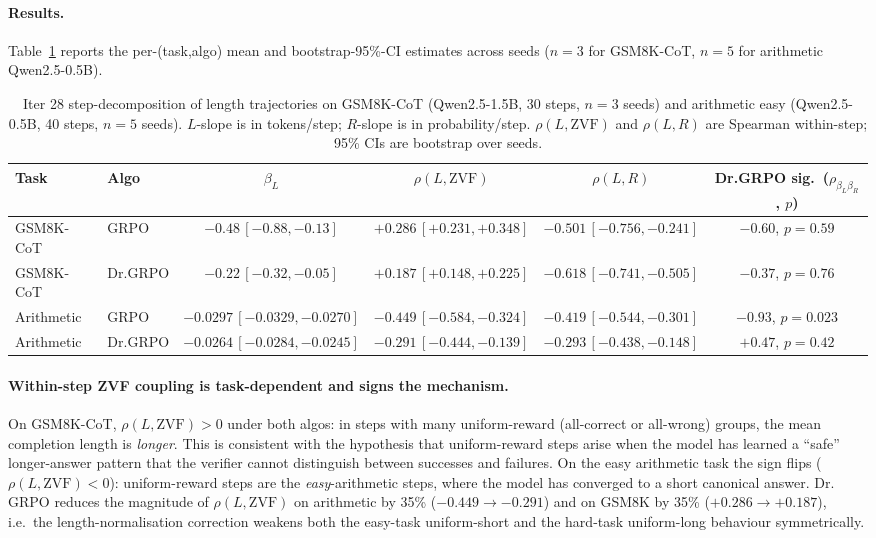 \paragraph{Results.}
Table~\ref{tab:length-bias-iter28} reports the per-(task,algo) mean and
bootstrap-95\%-CI estimates across seeds ($n{=}3$ for GSM8K-CoT,
$n{=}5$ for arithmetic Qwen2.5-0.5B).

\begin{table}[htbp]
\centering
\small
\caption{Iter 28 step-decomposition of length trajectories on GSM8K-CoT
(Qwen2.5-1.5B, 30 steps, $n{=}3$ seeds) and arithmetic easy
(Qwen2.5-0.5B, 40 steps, $n{=}5$ seeds). $L$-slope is in tokens/step;
$R$-slope is in probability/step. $\rho(L,\mathrm{ZVF})$ and $\rho(L,R)$
are Spearman within-step; 95\% CIs are bootstrap over seeds.
\label{tab:length-bias-iter28}}
\begin{tabular}{llcccc}
\hline
Task & Algo & $\beta_L$ & $\rho(L,\mathrm{ZVF})$ & $\rho(L,R)$ & Dr.GRPO sig.\ ($\rho_{\beta_L\beta_R}$, $p$) \\
\hline
GSM8K-CoT & GRPO & $-0.48\,[-0.88,-0.13]$ & $+0.286\,[+0.231,+0.348]$ & $-0.501\,[-0.756,-0.241]$ & $-0.60$, $p{=}0.59$ \\
GSM8K-CoT & Dr.GRPO & $-0.22\,[-0.32,-0.05]$ & $+0.187\,[+0.148,+0.225]$ & $-0.618\,[-0.741,-0.505]$ & $-0.37$, $p{=}0.76$ \\
Arithmetic & GRPO & $-0.0297\,[-0.0329,-0.0270]$ & $-0.449\,[-0.584,-0.324]$ & $-0.419\,[-0.544,-0.301]$ & $\mathbf{-0.93}$, $p{=}0.023$ \\
Arithmetic & Dr.GRPO & $-0.0264\,[-0.0284,-0.0245]$ & $-0.291\,[-0.444,-0.139]$ & $-0.293\,[-0.438,-0.148]$ & $+0.47$, $p{=}0.42$ \\
\hline
\end{tabular}
\end{table}

\paragraph{Within-step ZVF coupling is task-dependent and signs the
mechanism.}
On GSM8K-CoT, $\rho(L, \mathrm{ZVF}) > 0$ under both algos: in steps with
many uniform-reward (all-correct or all-wrong) groups, the mean
completion length is \emph{longer}. This is consistent with the
hypothesis that uniform-reward steps arise when the model has learned a
``safe'' longer-answer pattern that the verifier cannot distinguish
between successes and failures. On the easy arithmetic task the sign
flips ($\rho(L, \mathrm{ZVF}) < 0$): uniform-reward steps are the
\emph{easy}-arithmetic steps, where the model has converged to a short
canonical answer. Dr.\,GRPO reduces the magnitude of $\rho(L, \mathrm{ZVF})$
on arithmetic by 35\% ($-0.449 \to -0.291$) and on GSM8K by 35\%
($+0.286 \to +0.187$), i.e.\ the length-normalisation correction
weakens both the easy-task uniform-short and the hard-task uniform-long
behaviour symmetrically.

